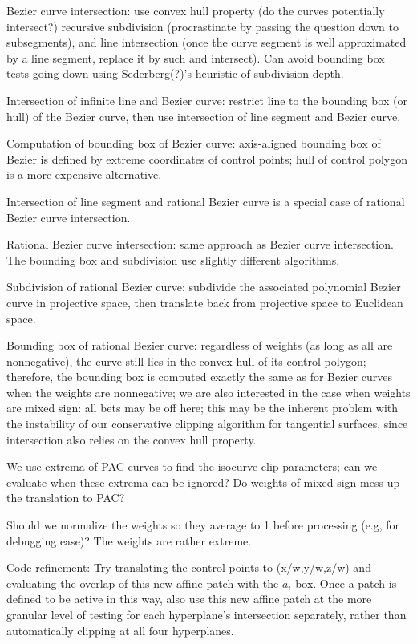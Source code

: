 \documentclass[11pt]{article}
\begin{document}
Bezier curve intersection: use convex hull property (do the curves potentially intersect?)
recursive subdivision (procrastinate by passing the question down to subsegments),
and line intersection (once the curve segment is well approximated by a line segment,
replace it by such and intersect).
Can avoid bounding box tests going down using Sederberg(?)'s heuristic of subdivision depth.

Intersection of infinite line and Bezier curve: restrict line to the bounding box (or hull)
of the Bezier curve, then use intersection of line segment and Bezier curve.

Computation of bounding box of Bezier curve:
axis-aligned bounding box of Bezier is defined by extreme coordinates of control points;
hull of control polygon is a more expensive alternative.

Intersection of line segment and rational Bezier curve is a special case of rational
Bezier curve intersection.

Rational Bezier curve intersection: same approach as Bezier curve intersection.
The bounding box and subdivision use slightly different algorithms.

Subdivision of rational Bezier curve: subdivide the associated polynomial Bezier curve
in projective space, then translate back from projective space to Euclidean space.

Bounding box of rational Bezier curve: regardless of weights (as long as all are nonnegative),
the curve still lies in the convex hull of its control polygon;
therefore, the bounding box is computed exactly the same as for Bezier curves when 
the weights are nonnegative;
we are also interested in the case when weights are mixed sign: all bets may be off here;
this may be the inherent problem with the instability of our conservative clipping algorithm
for tangential surfaces, since intersection also relies on the convex hull property.

We use extrema of PAC curves to find the isocurve clip parameters;
can we evaluate when these extrema can be ignored?
Do weights of mixed sign mess up the translation to PAC?

Should we normalize the weights so they average to 1 before processing (e.g, for debugging ease)?
The weights are rather extreme.

Code refinement: Try translating the control points to (x/w,y/w,z/w) and evaluating the overlap of this
new affine patch with the $a_i$ box.
Once a patch is defined to be active in this way,
also use this new affine patch at the more granular level of testing for each hyperplane's
intersection separately, rather than automatically clipping at all four hyperplanes.
\end{document}
